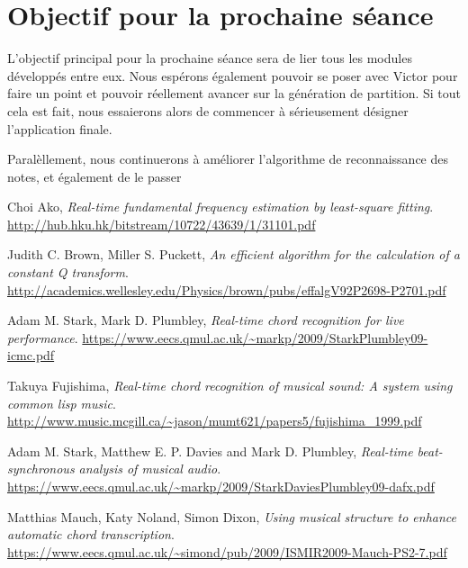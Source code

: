 \documentclass[12pt]{article}
\begin{document}
\section{Objectif pour la prochaine séance}

\par L'objectif principal pour la prochaine séance sera de lier tous les modules développés entre eux. Nous espérons également pouvoir se poser avec Victor pour faire un point et pouvoir réellement avancer sur la génération de partition. Si tout cela est fait, nous essaierons alors de commencer à sérieusement désigner l'application finale.
\par Paralèllement, nous continuerons à améliorer l'algorithme de reconnaissance des notes, et également de le passer 
\newpage

\begin{thebibliography}{9}

  Choi Ako,
  \emph{Real-time fundamental frequency estimation by least-square fitting}.
  \url{http://hub.hku.hk/bitstream/10722/43639/1/31101.pdf}


  Judith C. Brown, Miller S. Puckett,
  \emph{An efficient algorithm for the calculation of a constant Q transform}.
  \url{http://academics.wellesley.edu/Physics/brown/pubs/effalgV92P2698-P2701.pdf}


  Adam M. Stark, Mark D. Plumbley,
  \emph{Real-time chord recognition for live performance}.
  \url{https://www.eecs.qmul.ac.uk/~markp/2009/StarkPlumbley09-icmc.pdf}


  Takuya Fujishima,
  \emph{Real-time chord recognition of musical sound: A system using common lisp music}.
  \url{http://www.music.mcgill.ca/~jason/mumt621/papers5/fujishima_1999.pdf}


  Adam M. Stark, Matthew E. P. Davies and Mark D. Plumbley,
  \emph{Real-time beat-synchronous analysis of musical audio}.
  \url{https://www.eecs.qmul.ac.uk/~markp/2009/StarkDaviesPlumbley09-dafx.pdf}


  Matthias Mauch, Katy Noland, Simon Dixon,
  \emph{Using musical structure to enhance automatic chord transcription}.
  \url{https://www.eecs.qmul.ac.uk/~simond/pub/2009/ISMIR2009-Mauch-PS2-7.pdf}

\end{thebibliography}
\end{document}
